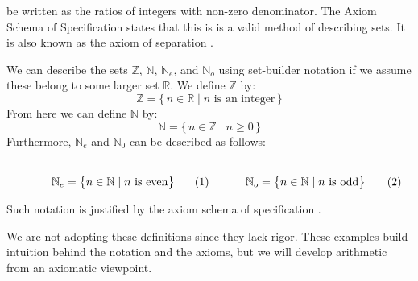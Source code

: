         be written as the ratios of integers with non-zero denominator. The
        Axiom Schema of Specification states that this is is a valid method of
        describing sets. It is also known as the axiom of separation%
        .
        \begin{example}
            We can describe the sets $\mathbb{Z}$, $\mathbb{N}$,
            $\mathbb{N}_{e}$, and $\mathbb{N}_{o}$ using set-builder notation if
            we assume these belong to some larger set $\mathbb{R}$. We define
            $\mathbb{Z}$ by:
            \begin{equation}
                \mathbb{Z}=
                \big\{\,n\in\mathbb{R}\;|\;n\textrm{ is an integer}\,\big\}
            \end{equation}
            From here we can define $\mathbb{N}$ by:
            \begin{equation}
                \mathbb{N}=\{\,n\in\mathbb{Z}\;|\;n\geq{0}\,\}
            \end{equation}
            Furthermore, $\mathbb{N}_{e}$ and $\mathbb{N}_{0}$ can be described
            as follows:
            \par
            \begin{subequations}
                \begin{minipage}[b]{0.495\textwidth}
                    \centering
                    \begin{equation}
                        \label{eqn:Even_Pos_Ints_Set_Builder}%
                        \mathbb{N}_{e}=
                        \big\{n\in\mathbb{N}\;|\;n\textrm{ is even}\big\}
                    \end{equation}
                \end{minipage}
                \hfill
                \begin{minipage}[b]{0.495\textwidth}
                    \centering
                    \begin{equation}
                        \label{eqn:Odd_Pos_Ints_Set_Builder}%
                        \mathbb{N}_{o}=
                        \big\{n\in\mathbb{N}\;|\;n\textrm{ is odd}\big\}
                    \end{equation}
                \end{minipage}
            \end{subequations}
            \par\vspace{2.5ex}
            Such notation is justified by the axiom schema of specification%
            .
        \end{example}
        We are not adopting these definitions since they lack rigor. These
        examples build intuition behind the notation and the axioms, but we will
        develop arithmetic from an axiomatic viewpoint.
